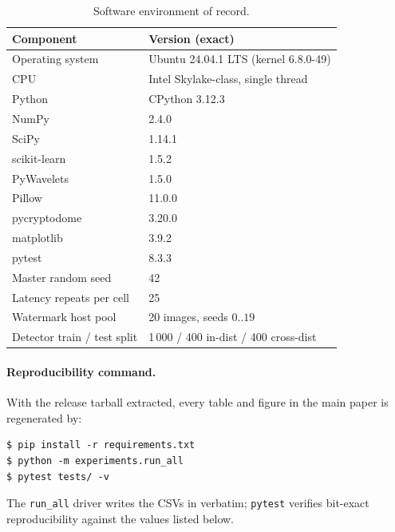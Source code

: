 \documentclass[11pt,a4paper]{article}
\begin{document}
\begin{table}[!ht]\centering
\caption{Software environment of record.}\label{tab:env}
\small
\begin{tabular}{l l}
\toprule
Component & Version (exact) \\
\midrule
Operating system           & Ubuntu 24.04.1 LTS (kernel 6.8.0-49) \\
CPU                        & Intel Skylake-class, single thread \\
Python                     & CPython 3.12.3 \\
NumPy                      & 2.4.0 \\
SciPy                      & 1.14.1 \\
scikit-learn               & 1.5.2 \\
PyWavelets                 & 1.5.0 \\
Pillow                     & 11.0.0 \\
pycryptodome               & 3.20.0 \\
matplotlib                 & 3.9.2 \\
pytest                     & 8.3.3 \\
\midrule
Master random seed         & 42 \\
Latency repeats per cell   & 25 \\
Watermark host pool        & 20 images, seeds $0..19$ \\
Detector train / test split & 1\,000 / 400 in-dist / 400 cross-dist \\
\bottomrule
\end{tabular}
\end{table}

\paragraph{Reproducibility command.}
With the release tarball extracted, every table and figure in the
main paper is regenerated by:
\begin{lstlisting}[basicstyle=\ttfamily\small, frame=none, backgroundcolor=\color{white}, numbers=none]
$ pip install -r requirements.txt
$ python -m experiments.run_all
$ pytest tests/ -v
\end{lstlisting}
The \texttt{run\_all} driver writes the CSVs in
 verbatim; \texttt{pytest} verifies bit-exact
reproducibility against the values listed below.

\end{document}
